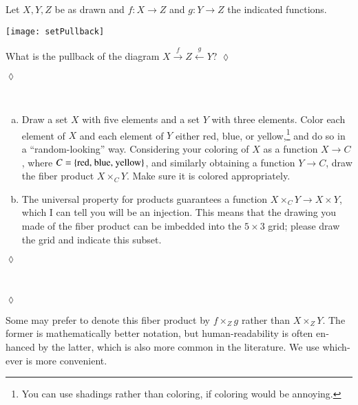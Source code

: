 \documentclass[a4paper]{book}
\def\tn{\textnormal}
\def\to{\rightarrow}
\def\taking{\colon}
\newcommand{\Too}[1]{\xrightarrow{\ \ #1\ \ }}
\newcommand{\Fromm}[1]{\xleftarrow{\ \ #1\ \ }}
\theoremstyle{myth}
\newtheorem{remarkENG}[envENG]{\begin{english}Remark\end{english}}
\newtheorem{excENG}[envENG]{\begin{english}Exercise\end{english}}
\newenvironment{exerciseENG}{\begin{excENG}}{\hspace*{\fill}$\lozenge$\end{excENG}}
\newtheorem{excRUS}[envRUS]{\begin{russian}Упражнение\end{russian}}
\newtheorem{definitionRUS}[envRUS]{\begin{russian}Определение\end{russian}}
\newenvironment{exerciseRUS}{\begin{excRUS}}{\hspace*{\fill}$\lozenge$\end{excRUS}}
\def\sexc{\begin{enumerate}[a.)]\setlength{\itemsep}{.1cm}\setlength{\parskip}{.1cm}\item}
\def\next{\item}
\def\endsexc{\end{enumerate}}
\begin{document}
\begin{english}
\begin{definitionRUS}\label{def:pullback}
\begin{russian} \end{russian}
\end{definitionRUS}

\begin{exerciseENG}
Let $X,Y,Z$ be as drawn and $f\taking X\to Z$ and $g\taking Y\to Z$ the indicated functions. 
\begin{center}
\texttt{[image: setPullback]}
\end{center}
What is the pullback of the diagram $X\Too{f}Z\Fromm{g}Y$?
\end{exerciseENG}

\begin{exerciseRUS}
\begin{russian} \end{russian}
\end{exerciseRUS}

\begin{exerciseENG}~
\sexc Draw a set $X$ with five elements and a set $Y$ with three elements. Color each element of $X$ and each element of $Y$ either red, blue, or yellow,\footnote{You can use shadings rather than coloring, if coloring would be annoying.}
and do so in a “random-looking” way. Considering your coloring of $X$ as a function $X\to C$, where $C=\{\tn{red, blue, yellow}\}$, and similarly obtaining a function $Y\to C$, draw the fiber product $X\times_CY$. Make sure it is colored appropriately.
\next The universal property for products guarantees a function $X\times_CY\to X\times Y$, which I can tell you will be an injection. This means that the drawing you made of the fiber product can be imbedded into the $5\times 3$ grid; please draw the grid and indicate this subset.
\endsexc
\end{exerciseENG}

\begin{exerciseRUS}~
\begin{russian} \end{russian}
\end{exerciseRUS}

\begin{remarkENG}
Some may prefer to denote this fiber product by $f\times_Zg$ rather than $X\times_ZY$. The former is  mathematically better notation, but human-readability is often enhanced by the latter, which is also more common in the literature. We use whichever is more convenient.
\end{remarkENG}


\end{english}
\end{document}
